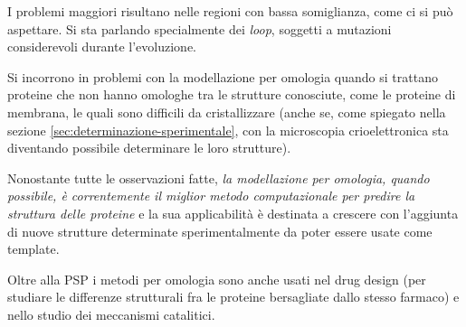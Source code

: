 {	\par I problemi maggiori risultano nelle regioni con bassa somiglianza, come ci si può aspettare. Si sta parlando specialmente dei \textit{loop}, soggetti a mutazioni considerevoli durante l'evoluzione.
	
	\par Si incorrono in problemi con la modellazione per omologia quando si trattano proteine che non hanno omologhe tra le strutture conosciute, come le proteine di membrana, le quali sono difficili da cristallizzare (anche se, come spiegato nella sezione \ref{sec:determinazione-sperimentale}, con la microscopia crioelettronica sta diventando possibile determinare le loro strutture). \\
	
	\par Nonostante tutte le osservazioni fatte, \textit{la modellazione per omologia, quando possibile, è correntemente il miglior metodo computazionale per predire la struttura delle proteine} e la sua applicabilità è destinata a crescere con l'aggiunta di nuove strutture determinate sperimentalmente da poter essere usate come template.
	
	\par Oltre alla PSP i metodi per omologia sono anche usati nel drug design (per studiare le differenze strutturali fra le proteine bersagliate dallo stesso farmaco) e nello studio dei meccanismi catalitici.
	
}

